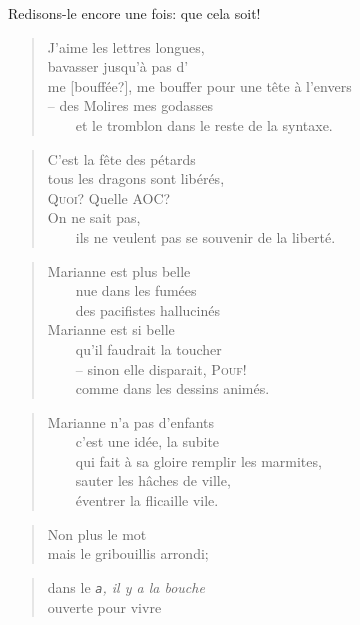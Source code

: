   Redisons-le encore une fois: que cela soit!
  \begin{verse}
    J’aime les lettres longues,\\
    bava{\Huge ss}er jusqu’à pas d’\\
    me [bouffée?], me bouffer pour une tête à l’envers\\
    -- des Molires mes godasses\\
    ~~~~et le tromblon dans le reste de la syntaxe.
  \end{verse}
  \begin{verse}
    C’est la fête des pétards\\
    tous les dragons sont libérés,\\
    \textsc{Quoi?} Quelle AOC?\\
    On ne sait pas,\\
    ~~~~ils ne veulent pas se souvenir de la liberté.
  \end{verse}
  \begin{verse}
    Marianne est plus belle\\
    ~~~~nue dans les fumées\\
    ~~~~des pacifistes hallucinés\\
    Marianne est si belle\\
    ~~~~qu’il faudrait la toucher\\
    ~~~~-- sinon elle disparait, \textsc{Pouf!}\\
    ~~~~comme dans les dessins animés.
  \end{verse}
  \begin{verse}
    Marianne n’a pas d’enfants\\
    ~~~~c’est une idée, la subite\\
    ~~~~qui fait à sa gloire remplir les marmites,\\
    ~~~~sauter les hâches de ville,\\
    ~~~~éventrer la flicaille vile.
  \end{verse}
  \begin{verse}
    Non plus le mot\\
    mais le gribouillis arrondi;
  \end{verse}
  \begin{verse}
    dans le \emph{\texttt{a}, il y a la bouche\\}
    ouverte pour vivre
  \end{verse}
